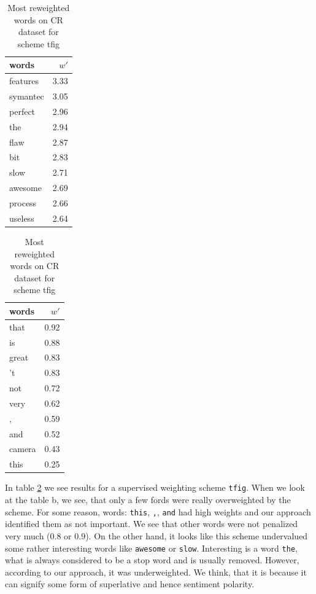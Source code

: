 \begin{table}[H]
    \centering
    \begin{minipage}{.4\linewidth}
      \centering
        \begin{tabular}{lr}
\toprule
    words &  $w'$ \\
\midrule
 features &  3.33 \\
 symantec &  3.05 \\
  perfect &  2.96 \\
      the &  2.94 \\
     flaw &  2.87 \\
      bit &  2.83 \\
     slow &  2.71 \\
  awesome &  2.69 \\
  process &  2.66 \\
  useless &  2.64 \\
\bottomrule
\end{tabular}

    \end{minipage}
    \begin{minipage}{.4\linewidth}
      \centering
        \begin{tabular}{lr}
\toprule
  words &  $w'$ \\
\midrule
   that &  0.92 \\
     is &  0.88 \\
  great &  0.83 \\
     't &  0.83 \\
    not &  0.72 \\
   very &  0.62 \\
      , &  0.59 \\
    and &  0.52 \\
 camera &  0.43 \\
   this &  0.25 \\
\bottomrule
\end{tabular}

    \end{minipage} 
    \caption{Most reweighted words on CR dataset for scheme tfig}
    \label{tab:words:CR:tfig}
\end{table}

    In table \ref{tab:words:CR:tfig} we see results for a supervised weighting scheme \texttt{tfig}.
    When we look at the table b, we see, that only a few fords were really overweighted by the scheme. 
    For some reason, words: \texttt{this}, \texttt{,}, \texttt{and} had high weights and our approach identified them as not important.
    We see that other words were not penalized very much ($0.8$ or $0.9$).
    On the other hand, it looks like this scheme undervalued some rather interesting words like \texttt{awesome} or \texttt{slow}.
    Interesting is a word \texttt{the}, what is always considered to be a stop word and is usually removed. 
    However, according to our approach, it was underweighted. 
    We think, that it is because it can signify some form of superlative and hence sentiment polarity.
    

